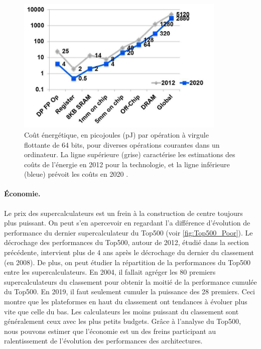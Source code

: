        \begin{figure}
        \center
        \includegraphics[width=10cm]{images/energy_pj.png}
        \caption{\label{fig:energy_pj} Coût énergétique, en picojoules (pJ) par opération à virgule flottante de 64 bits, pour diverses opérations courantes dans un ordinateur. La ligne supérieure (grise) caractérise les estimations des coûts de l'énergie en 2012 pour la technologie, et la ligne inférieure (bleue) prévoit les coûts en 2020 \cite{Leland2014}.}
        \end{figure}
        
        
        \paragraph{Économie.} Le prix des supercalculateurs est un frein à la construction de centre toujours plus puissant. On peut s'en apercevoir en regardant l'a différence d'évolution de performance du dernier supercalculateur du Top500 (voir \autoref{fig:Top500_Poor}). Le décrochage des performances du Top500, autour de 2012, étudié dans la section précédente, intervient plus de 4 ans après le décrochage du dernier du classement (en 2008). De plus, on peut étudier la répartition de la performances du Top500 entre les supercalculateurs. En 2004, il fallait agréger les 80 premiers supercalculateurs du classement pour obtenir la moitié de la performance cumulée du Top500. En 2019, il faut seulement cumuler la puissance des 28 premiers. Ceci montre que les plateformes en haut du classement ont tendances à évoluer plus vite que celle du bas. Les calculateurs les moins puissant du classement sont généralement ceux avec les plus petits budgets. Grâce à l'analyse du Top500, nous pouvons estimer que l'économie est un des freins participant au ralentissement de l'évolution des performances des architectures.
        
